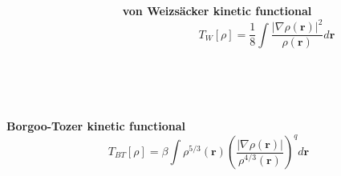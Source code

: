 \documentclass[mathserif, 8pt]{beamer}
\begin{document}
\begin{frame}
\begin{columns}
\begin{column}{.50\textwidth}
\begin{equation}
	\end{equation}
    \end{column}
    \begin{column}{.50\textwidth}
	\centering
	\textbf{von Weizs\"{a}cker kinetic functional}
	\begin{equation}
	    \nonumber
	    T_{W}[\rho] = \frac{1}{8}\int \frac{|\nabla\rho(\boldsymbol{r})|^2}{\rho(\boldsymbol{r})} d\boldsymbol{r}
	\end{equation}
    \end{column}
    \end{columns}
    \ \\
    \ \\
    \ \\
    \centering
    \textbf{Borgoo-Tozer kinetic functional}
    \begin{equation}
        \nonumber
        T_{BT}[\rho] = \beta \int \rho^{5/3}(\boldsymbol{r})\left(\frac{|\nabla\rho(\boldsymbol{r})|}{\rho^{4/3}(\boldsymbol{r})}\right)^q d\boldsymbol{r}
    \end{equation}
\end{frame}
\end{document}
